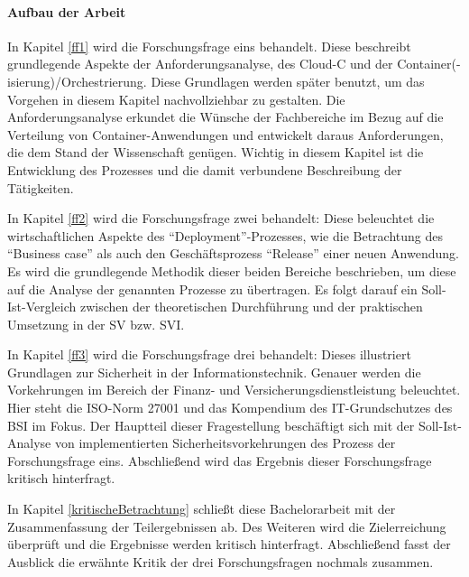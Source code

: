 \paragraph{Aufbau der Arbeit}
In Kapitel \vref{ff1} wird die Forschungsfrage eins behandelt. Diese beschreibt grundlegende Aspekte der Anforderungsanalyse, des \acl{Cloud-C} und der Container(-isierung)/Orchestrierung. Diese Grundlagen werden später benutzt, um das Vorgehen in diesem Kapitel nachvollziehbar zu gestalten. Die Anforderungsanalyse erkundet die Wünsche der Fachbereiche im Bezug auf die Verteilung von Container-Anwendungen und entwickelt daraus Anforderungen, die dem Stand der Wissenschaft genügen. Wichtig in diesem Kapitel ist die Entwicklung des Prozesses und die damit verbundene Beschreibung der Tätigkeiten.
\par
In Kapitel \vref{ff2} wird die Forschungsfrage zwei behandelt: Diese beleuchtet die wirtschaftlichen Aspekte des \enquote{Deployment}-Prozesses, wie die Betrachtung des \enquote{Business case} als auch den Geschäftsprozess \enquote{Release} einer neuen Anwendung. Es wird die grundlegende Methodik dieser beiden Bereiche beschrieben, um diese auf die Analyse der genannten Prozesse zu übertragen. Es folgt darauf ein Soll-Ist-Vergleich zwischen der theoretischen Durchführung und der praktischen Umsetzung in der \ac{SV} bzw. \ac{SVI}.
\par
In Kapitel \vref{ff3} wird die Forschungsfrage drei behandelt: Dieses illustriert Grundlagen zur Sicherheit in der Informationstechnik. Genauer werden die Vorkehrungen im Bereich der Finanz- und Versicherungsdienstleistung beleuchtet. Hier steht die ISO-Norm 27001 und das Kompendium des IT-Grundschutzes des \ac{BSI} im Fokus. Der Hauptteil dieser Fragestellung beschäftigt sich mit der Soll-Ist-Analyse von implementierten Sicherheitsvorkehrungen des Prozess der Forschungsfrage eins. Abschließend wird das Ergebnis dieser Forschungsfrage kritisch hinterfragt.
\par
In Kapitel \vref{kritischeBetrachtung} schließt diese Bachelorarbeit mit der Zusammenfassung der Teilergebnissen ab. Des Weiteren wird die Zielerreichung überprüft und die Ergebnisse werden kritisch hinterfragt. Abschließend fasst der Ausblick die erwähnte Kritik der drei Forschungsfragen nochmals zusammen. 
